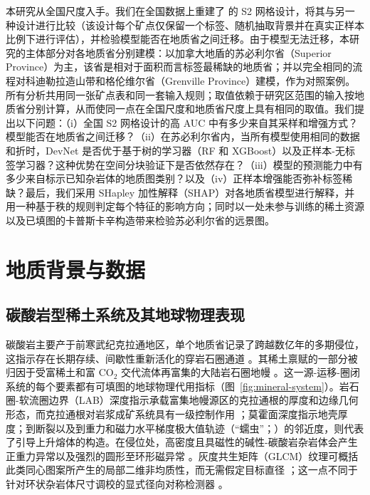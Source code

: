 \documentclass[pdflatex,sn-apa]{sn-jnl}
\begin{document}
本研究从全国尺度入手。我们在全国数据上重建了 \citet{Parsa2024} 的 S2 网格设计，将其与另一种设计进行比较（该设计每个矿点仅保留一个标签、随机抽取背景并在真实正样本比例下进行评估），并检验模型能否在地质省之间迁移。由于模型无法迁移，本研究的主体部分对各地质省分别建模：以加拿大地盾的苏必利尔省（Superior Province）为主，该省是相对于面积而言标签最稀缺的地质省；并以完全相同的流程对科迪勒拉造山带和格伦维尔省（Grenville Province）建模，作为对照案例。所有分析共用同一张矿点表和同一套输入规则；取值依赖于研究区范围的输入按地质省分别计算，从而使同一点在全国尺度和地质省尺度上具有相同的取值。我们提出以下问题：（i）全国 S2 网格设计的高 AUC 中有多少来自其采样和增强方式？模型能否在地质省之间迁移？（ii）在苏必利尔省内，当所有模型使用相同的数据和折时，DevNet 是否优于基于树的学习器（RF 和 XGBoost）以及正样本-无标签学习器？这种优势在空间分块验证下是否依然存在？（iii）模型的预测能力中有多少来自标示已知杂岩体的地质图类别？以及（iv）正样本增强能否弥补标签稀缺？最后，我们采用 SHapley 加性解释（SHAP）对各地质省模型进行解释，并用一种基于秩的规则判定每个特征的影响方向；同时以一处未参与训练的稀土资源以及已填图的卡普斯卡辛构造带来检验苏必利尔省的远景图。

\section{地质背景与数据}\label{sec:data}

\subsection{碳酸岩型稀土系统及其地球物理表现}\label{sec:mineral-system}

碳酸岩主要产于前寒武纪克拉通地区，单个地质省记录了跨越数亿年的多期侵位，这指示存在长期存续、间歇性重新活化的穿岩石圈通道 \citep{Woolley2012}。其稀土禀赋的一部分被归因于受富稀土和富 CO$_2$ 交代流体再富集的大陆岩石圈地幔 \citep{Hou2023,Yaxley2021}。这一源-运移-圈闭系统的每个要素都有可填图的地球物理代用指标（图~\ref{fig:mineral-system}）。岩石圈-软流圈边界（LAB）深度指示承载富集地幔源区的克拉通根的厚度和边缘几何形态，而克拉通根对岩浆成矿系统具有一级控制作用 \citep{Griffin2013,Groves2021,Hoggard2020}；莫霍面深度指示地壳厚度；到断裂以及到重力和磁力水平梯度极大值轨迹（“蠕虫”；\citealp{Hornby1999}）的邻近度，则代表了引导上升熔体的构造。在侵位处，高密度且具磁性的碱性-碳酸岩杂岩体会产生正重力异常以及强烈的圆形至环形磁异常 \citep{Thomas2016,Drenth2014}。灰度共生矩阵（GLCM）纹理可概括此类同心图案所产生的局部二维非均质性，而无需假定目标直径 \citep{Cooper2005,HallBeyer2017}；这一点不同于针对环状杂岩体尺寸调校的显式径向对称检测器 \citep{Aranha2021}。
\end{document}
